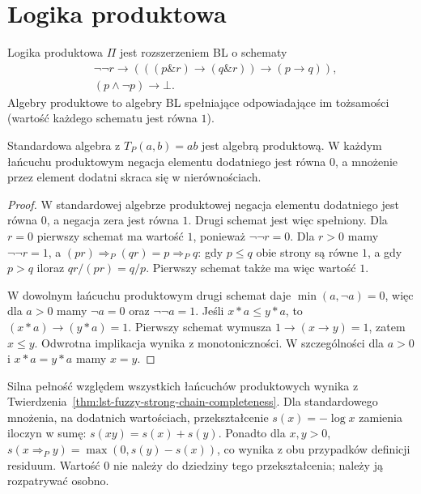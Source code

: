 \section{Logika produktowa}
\begin{definicja}\label{def:lst-fuzzy-product-logic}
Logika produktowa $\Pi$ jest rozszerzeniem BL o schematy
\begin{align*}
 &\neg\neg r\to
 (((p\mathbin{\&}r)\to(q\mathbin{\&}r))\to(p\to q)),\\
 &(p\wedge\neg p)\to\bot.
\end{align*}
Algebry produktowe to algebry BL spełniające odpowiadające
im tożsamości (wartość każdego schematu jest równa $1$).
\end{definicja}
\begin{stwierdzenie}\label{prop:lst-fuzzy-product-sound}
Standardowa algebra z $T_P(a,b)=ab$ jest algebrą produktową.
W każdym łańcuchu produktowym negacja elementu dodatniego
jest równa $0$, a mnożenie przez element dodatni
skraca się w nierównościach.
\end{stwierdzenie}
\begin{proof}
W standardowej algebrze produktowej negacja elementu
dodatniego jest równa $0$, a negacja zera jest równa $1$.
Drugi schemat jest więc spełniony. Dla $r=0$ pierwszy
schemat ma wartość $1$, ponieważ $\neg\neg r=0$.
Dla $r>0$ mamy $\neg\neg r=1$, a
$(pr)\Rightarrow_P(qr)=p\Rightarrow_P q$: gdy $p\leq q$
obie strony są równe $1$, a gdy $p>q$ iloraz $qr/(pr)=q/p$.
Pierwszy schemat także ma więc wartość $1$.

W dowolnym łańcuchu produktowym drugi schemat daje
$\min(a,\neg a)=0$, więc dla $a>0$ mamy $\neg a=0$
oraz $\neg\neg a=1$. Jeśli $x*a\leq y*a$, to
$(x*a)\to(y*a)=1$. Pierwszy schemat wymusza
$1\to(x\to y)=1$, zatem $x\leq y$.
Odwrotna implikacja wynika z monotoniczności.
W szczególności dla $a>0$ i $x*a=y*a$ mamy $x=y$.
\end{proof}
Silna pełność względem wszystkich łańcuchów produktowych
wynika z Twierdzenia~\ref{thm:lst-fuzzy-strong-chain-completeness}.
Dla standardowego mnożenia, na dodatnich wartościach,
przekształcenie $s(x)=-\log x$ zamienia iloczyn w sumę:
$s(xy)=s(x)+s(y)$. Ponadto dla $x,y>0$,
$s(x\Rightarrow_P y)=\max(0,s(y)-s(x))$,
co wynika z obu przypadków definicji residuum.
Wartość $0$ nie należy do dziedziny tego przekształcenia;
należy ją rozpatrywać osobno.

